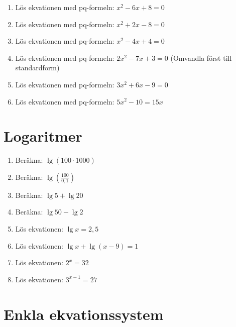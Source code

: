 \documentclass[a4paper,11pt]{article}
\begin{document}
\begin{enumerate}[label=\textbf{\arabic*.}]
    \item Lös ekvationen med pq-formeln: $x^2 - 6x + 8 = 0$
    
    \item Lös ekvationen med pq-formeln: $x^2 + 2x - 8 = 0$
    
    \item Lös ekvationen med pq-formeln: $x^2 - 4x + 4 = 0$
    
    \item Lös ekvationen med pq-formeln: $2x^2 - 7x + 3 = 0$ (Omvandla först till standardform)
    
    \item Lös ekvationen med pq-formeln: $3x^2 + 6x - 9 = 0$ 
    
    \item Lös ekvationen med pq-formeln: $5x^2 - 10 = 15x$ 
\end{enumerate}

\section{Logaritmer}

\begin{enumerate}[label=\textbf{\arabic*.}]
    \item Beräkna: $\lg(100 \cdot 1000)$
    
    \item Beräkna: $\lg\left(\frac{100}{0,1}\right)$
    
    \item Beräkna: $\lg 5 + \lg 20$
    
    \item Beräkna: $\lg 50 - \lg 2$
    
    \item Lös ekvationen: $\lg x = 2,5$
    
    \item Lös ekvationen: $\lg x + \lg (x-9) = 1$
    
    \item Lös ekvationen: $2^x = 32$
    
    \item Lös ekvationen: $3^{x-1} = 27$
\end{enumerate}

\section{Enkla ekvationssystem}
\end{document}
